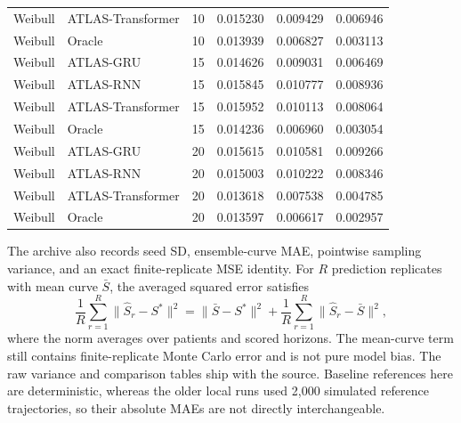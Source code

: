 \begin{longtable}{llrrrr}
Weibull & ATLAS-Transformer & 10 & 0.015230 & 0.009429 & 0.006946 \\
Weibull & Oracle & 10 & 0.013939 & 0.006827 & 0.003113 \\
Weibull & ATLAS-GRU & 15 & 0.014626 & 0.009031 & 0.006469 \\
Weibull & ATLAS-RNN & 15 & 0.015845 & 0.010777 & 0.008936 \\
Weibull & ATLAS-Transformer & 15 & 0.015952 & 0.010113 & 0.008064 \\
Weibull & Oracle & 15 & 0.014236 & 0.006960 & 0.003054 \\
Weibull & ATLAS-GRU & 20 & 0.015615 & 0.010581 & 0.009266 \\
Weibull & ATLAS-RNN & 20 & 0.015003 & 0.010222 & 0.008346 \\
Weibull & ATLAS-Transformer & 20 & 0.013618 & 0.007538 & 0.004785 \\
Weibull & Oracle & 20 & 0.013597 & 0.006617 & 0.002957 \\
\bottomrule\end{longtable}\normalsize
The archive also records seed SD, ensemble-curve MAE, pointwise sampling variance, and an exact finite-replicate MSE identity.  For $R$ prediction replicates with mean curve $\bar S$, the averaged squared error satisfies
\[
 \frac1R\sum_{r=1}^R\|\widehat S_r-S^*\|^2
 =\|\bar S-S^*\|^2+\frac1R\sum_{r=1}^R\|\widehat S_r-\bar S\|^2,
\]
where the norm averages over patients and scored horizons. The mean-curve term still contains finite-replicate Monte Carlo error and is not pure model bias. The raw variance and comparison tables ship with the source. Baseline references here are deterministic, whereas the older local runs used 2,000 simulated reference trajectories, so their absolute MAEs are not directly interchangeable.
